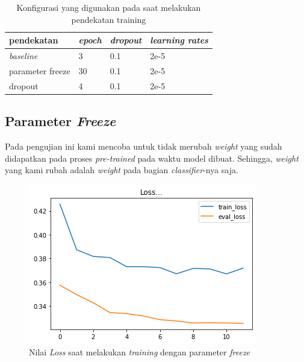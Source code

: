 \begin{table}[h]
    \centering
    \caption{Konfigurasi yang digunakan pada saat melakukan pendekatan training}
    \label{tab: training_config}
    \begin{tabular}{|l|l|l|l|}
        \hline
        \textbf{pendekatan} & \textit{\textbf{epoch}} & \textit{\textbf{dropout}} & \textit{\textbf{learning rates}} \\ \hline
        \textit{baseline}   & 3                       & 0.1                       & 2e-5                             \\ \hline
        parameter freeze    & 30                      & 0.1                       & 2e-5                             \\ \hline
        dropout             & 4                       & 0.1                       & 2e-5                             \\ \hline
    \end{tabular}
\end{table}

\subsection{Parameter \textit{Freeze}}

Pada pengujian ini kami mencoba untuk tidak merubah \textit{weight} yang sudah didapatkan pada proses \textit{pre-trained} pada waktu model dibuat. Sehingga, \textit{weight} yang kami rubah adalah \textit{weight} pada bagian \textit{classifier}-nya saja.


\begin{figure}[h]
    \begin{center}
        \includegraphics[width= 0.9\linewidth]{gambar/loss_freeze_new.png}
        \caption{Nilai \textit{Loss} saat melakukan \textit{training} dengan parameter \textit{freeze}}
        \label{fig: loss_freeze}
    \end{center}
\end{figure}

